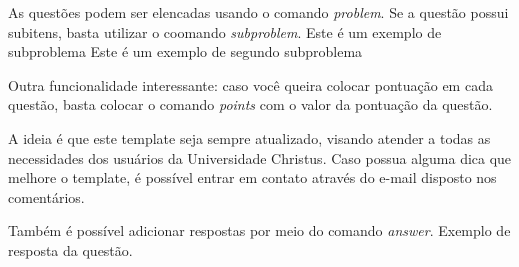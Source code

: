 \documentclass{lib/unichristusdoc}
\begin{document}
    \makeheader
    
    
    \vspace{1cm}
    \problem As questões podem ser elencadas usando o comando \textit{problem}. Se a questão possui subitens, basta utilizar o coomando \textit{subproblem}.
    \subproblem Este é um exemplo de subproblema
    \subproblem Este é um exemplo de segundo subproblema
    
    \vspace{1cm}
    \problem Outra funcionalidade interessante: caso você queira colocar pontuação em cada questão, basta colocar o comando \textit{points} com o valor da pontuação da questão. 
    
    \vspace{1cm}
    \problem A ideia é que este template seja sempre atualizado, visando atender a todas as necessidades dos usuários da Universidade Christus. Caso possua alguma dica que melhore o template, é possível entrar em contato através do e-mail disposto nos comentários.
    
    \vspace{1cm}
    \problem Também é possível adicionar respostas por meio do comando \textit{answer}. 
    \answer Exemplo de resposta da questão.
    
\end{document}
